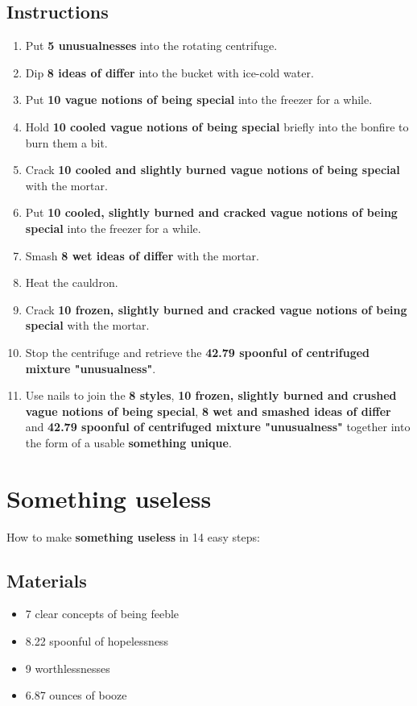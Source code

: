 \documentclass{article}
\begin{document}
\subsection{Instructions}\begin{enumerate}
\item 
Put \textbf{5 unusualnesses} into the rotating centrifuge.
\item 
Dip \textbf{8 ideas of differ} into the bucket with ice-cold water.
\item 
Put \textbf{10 vague notions of being special} into the freezer for a while.
\item 
Hold \textbf{10 cooled vague notions of being special} briefly into the bonfire to burn them a bit.
\item 
Crack \textbf{10 cooled and slightly burned vague notions of being special} with the mortar.
\item 
Put \textbf{10 cooled, slightly burned and cracked vague notions of being special} into the freezer for a while.
\item 
Smash \textbf{8 wet ideas of differ} with the mortar.
\item 
Heat the cauldron.
\item 
Crack \textbf{10 frozen, slightly burned and cracked vague notions of being special} with the mortar.
\item 
Stop the centrifuge and retrieve the \textbf{42.79 spoonful of centrifuged mixture "unusualness"}.
\item 
Use nails to join the \textbf{8 styles}, \textbf{10 frozen, slightly burned and crushed vague notions of being special}, \textbf{8 wet and smashed ideas of differ} and \textbf{42.79 spoonful of centrifuged mixture "unusualness"} together into the form of a usable \textbf{something unique}.
\end{enumerate}
\newpage
\section{Something useless}How to make \textbf{something useless} in 14 easy steps:

\subsection{Materials}\begin{itemize}
\item 
7 clear concepts of being feeble
\item 
8.22 spoonful of hopelessness
\item 
9 worthlessnesses
\item 
6.87 ounces of booze
\end{itemize}
\end{document}
